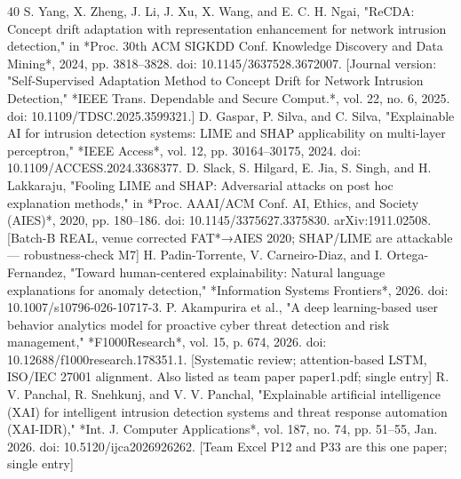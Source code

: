 \begin{thebibliography}{40}
 S. Yang, X. Zheng, J. Li, J. Xu, X. Wang, and E. C. H. Ngai, "ReCDA: Concept drift adaptation with representation enhancement for network intrusion detection," in *Proc. 30th ACM SIGKDD Conf. Knowledge Discovery and Data Mining*, 2024, pp. 3818–3828. doi: 10.1145/3637528.3672007. [Journal version: "Self-Supervised Adaptation Method to Concept Drift for Network Intrusion Detection," *IEEE Trans. Dependable and Secure Comput.*, vol. 22, no. 6, 2025. doi: 10.1109/TDSC.2025.3599321.]
 D. Gaspar, P. Silva, and C. Silva, "Explainable AI for intrusion detection systems: LIME and SHAP applicability on multi-layer perceptron," *IEEE Access*, vol. 12, pp. 30164–30175, 2024. doi: 10.1109/ACCESS.2024.3368377.
 D. Slack, S. Hilgard, E. Jia, S. Singh, and H. Lakkaraju, "Fooling LIME and SHAP: Adversarial attacks on post hoc explanation methods," in *Proc. AAAI/ACM Conf. AI, Ethics, and Society (AIES)*, 2020, pp. 180–186. doi: 10.1145/3375627.3375830. arXiv:1911.02508. [Batch-B REAL, venue corrected FAT*→AIES 2020; SHAP/LIME are attackable — robustness-check M7]
 H. Padin-Torrente, V. Carneiro-Diaz, and I. Ortega-Fernandez, "Toward human-centered explainability: Natural language explanations for anomaly detection," *Information Systems Frontiers*, 2026. doi: 10.1007/s10796-026-10717-3.
 P. Akampurira et al., "A deep learning-based user behavior analytics model for proactive cyber threat detection and risk management," *F1000Research*, vol. 15, p. 674, 2026. doi: 10.12688/f1000research.178351.1. [Systematic review; attention-based LSTM, ISO/IEC 27001 alignment. Also listed as team paper paper1.pdf; single entry]
 R. V. Panchal, R. Snehkunj, and V. V. Panchal, "Explainable artificial intelligence (XAI) for intelligent intrusion detection systems and threat response automation (XAI-IDR)," *Int. J. Computer Applications*, vol. 187, no. 74, pp. 51–55, Jan. 2026. doi: 10.5120/ijca2026926262. [Team Excel P12 and P33 are this one paper; single entry]
\end{thebibliography}
